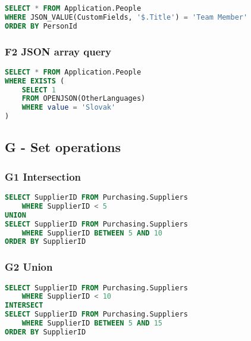 \begin{lstlisting}[language=SQL]
SELECT * FROM Application.People
WHERE JSON_VALUE(CustomFields, '$.Title') = 'Team Member'
ORDER BY PersonId
\end{lstlisting}

\subsubsection*{F2 JSON array query}

\begin{lstlisting}[language=SQL]
SELECT * FROM Application.People
WHERE EXISTS (
    SELECT 1
    FROM OPENJSON(OtherLanguages)
    WHERE value = 'Slovak'
)
\end{lstlisting}

\subsection{G - Set operations}

\subsubsection*{G1 Intersection}

\begin{lstlisting}[language=SQL]
SELECT SupplierID FROM Purchasing.Suppliers 
    WHERE SupplierID < 5
UNION
SELECT SupplierID FROM Purchasing.Suppliers 
    WHERE SupplierID BETWEEN 5 AND 10
ORDER BY SupplierID
\end{lstlisting}

\subsubsection*{G2 Union}

\begin{lstlisting}[language=SQL]
SELECT SupplierID FROM Purchasing.Suppliers 
    WHERE SupplierID < 10
INTERSECT
SELECT SupplierID FROM Purchasing.Suppliers 
    WHERE SupplierID BETWEEN 5 AND 15
ORDER BY SupplierID
\end{lstlisting}

